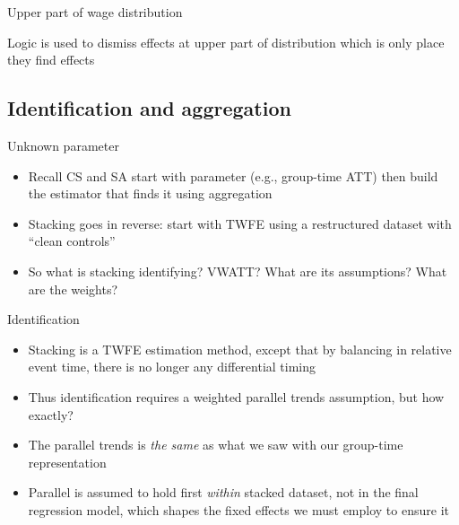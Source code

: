 \documentclass{beamer}
\begin{document}

\begin{frame}{Upper part of wage distribution}

Logic is used to dismiss effects at upper part of distribution which is only place they find effects

\end{frame}



\subsection{Identification and aggregation}


\begin{frame}{Unknown parameter}

\begin{itemize}
\item Recall CS and SA start with parameter (e.g., group-time ATT) then build the estimator that finds it using aggregation
\item Stacking goes in reverse: start with TWFE using a restructured dataset with ``clean controls''
\item So what is stacking identifying?  VWATT? What are its assumptions?  What are the weights?
\end{itemize}

\end{frame}


\begin{frame}{Identification}

\begin{itemize}
\item Stacking is a TWFE estimation method, except that by balancing in relative event time, there is no longer any differential timing
\item Thus identification requires a weighted parallel trends assumption, but how exactly?
\item The parallel trends is \emph{the same} as what we saw with our group-time representation
\item Parallel is assumed to hold first \emph{within} stacked dataset, not in the final regression model, which shapes the fixed effects we must employ to ensure it
\end{itemize}

\end{frame}
\end{document}
